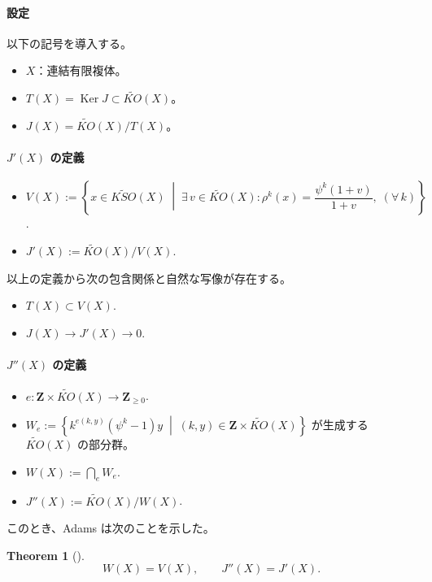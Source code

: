 \documentclass[uplatex,dvipdfmx,a4paper,12pt]{jlreq}
\newtheorem{theorem}{Theorem}
\newcommand{\Z}{\mathbf{Z}}
\newcommand{\Ker}{\operatorname{Ker}}
\begin{document}
\paragraph{設定}

以下の記号を導入する。
\begin{itemize}
  \item $X$：連結有限複体。
  \item $T(X) = \Ker J \subset \widetilde{KO}(X)$。
  \item $J(X) = \widetilde{KO}(X)/T(X)$。
\end{itemize}

\paragraph{$J'(X)$ の定義}

\begin{itemize}
  \item $V(X) := \left\{ x \in \widetilde{KSO}(X) \;\middle|\;
        \exists\, v \in \widetilde{KO}(X) :
        \rho^k(x) = \dfrac{\psi^k(1 + v)}{1 + v},\; (\forall\, k) \right\}$.
  \item $J'(X) := \widetilde{KO}(X)/V(X)$.
\end{itemize}

以上の定義から次の包含関係と自然な写像が存在する。
\begin{itemize}
  \item $T(X) \subset V(X)$.
  \item $J(X) \to J'(X) \to 0$.
\end{itemize}

\paragraph{$J''(X)$ の定義}

\begin{itemize}
  \item $e : \Z \times \widetilde{KO}(X) \longrightarrow \Z_{\geq 0}$.
  \item $W_e := \left\{ k^{e(k,y)}(\psi^k - 1)y
        \;\middle|\; (k, y) \in \Z \times \widetilde{KO}(X) \right\}$
        が生成する $\widetilde{KO}(X)$ の部分群。
  \item $W(X) := \bigcap_e W_e$.
  \item $J''(X) := \widetilde{KO}(X)/W(X)$.
\end{itemize}

このとき、Adams は次のことを示した。

\begin{theorem}[\cite{Ad65}]
  \[
    W(X) = V(X), \qquad J''(X) = J'(X).
  \]
\end{theorem}
\end{document}
